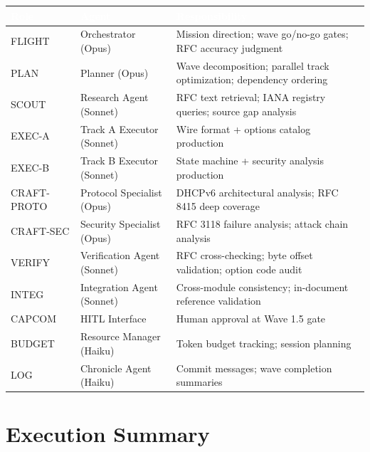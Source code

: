 \documentclass[11pt,letterpaper]{article}
\newcommand{\tableheader}[1]{\textbf{\sffamily\textcolor{white}{#1}}}
\begin{document}
\begin{center}
\begin{tabularx}{\textwidth}{L{2cm}L{3cm}X}
\toprule
{}
\tableheader{Role} & \tableheader{Agent} & \tableheader{Responsibility} \\
\midrule
FLIGHT & Orchestrator (Opus) & Mission direction; wave go/no-go gates; RFC accuracy judgment \\
PLAN & Planner (Opus) & Wave decomposition; parallel track optimization; dependency ordering \\
SCOUT & Research Agent (Sonnet) & RFC text retrieval; IANA registry queries; source gap analysis \\
EXEC-A & Track A Executor (Sonnet) & Wire format + options catalog production \\
EXEC-B & Track B Executor (Sonnet) & State machine + security analysis production \\
CRAFT-PROTO & Protocol Specialist (Opus) & DHCPv6 architectural analysis; RFC 8415 deep coverage \\
CRAFT-SEC & Security Specialist (Opus) & RFC 3118 failure analysis; attack chain analysis \\
VERIFY & Verification Agent (Sonnet) & RFC cross-checking; byte offset validation; option code audit \\
INTEG & Integration Agent (Sonnet) & Cross-module consistency; in-document reference validation \\
CAPCOM & HITL Interface & Human approval at Wave 1.5 gate \\
BUDGET & Resource Manager (Haiku) & Token budget tracking; session planning \\
LOG & Chronicle Agent (Haiku) & Commit messages; wave completion summaries \\
\bottomrule
\end{tabularx}
\end{center}

\section{Execution Summary}
\end{document}
